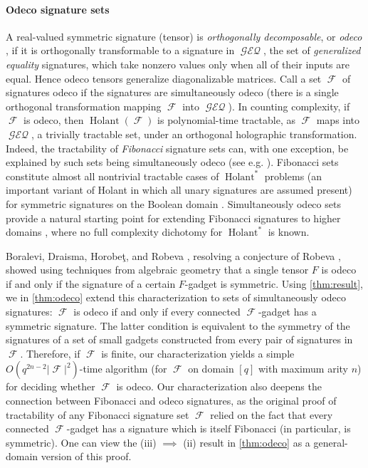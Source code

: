 \documentclass{article}
\DeclareMathOperator{\fc}{\mathcal{F}}
\DeclareMathOperator{\holant}{Holant}
\DeclareMathOperator{\geneq}{\mathcal{GEQ}}
\begin{document}
\paragraph{Odeco signature sets}
A real-valued symmetric signature (tensor) is \emph{orthogonally decomposable}, 
or \emph{odeco} \cite{robeva}, if it is orthogonally transformable to a signature in $\geneq$, the set
of \emph{generalized equality} signatures, which take nonzero values only when all of their inputs
are equal. Hence odeco tensors generalize diagonalizable matrices.
Call a set $\fc$ of signatures odeco if the signatures are simultaneously odeco (there
is a single orthogonal transformation mapping $\fc$ into $\geneq$).
In counting complexity, if $\fc$ is odeco, then
$\holant(\fc)$ is polynomial-time tractable, as $\fc$ maps into $\geneq$, a trivially tractable set,
under an orthogonal holographic transformation.
Indeed, the tractability of \emph{Fibonacci} signature sets \cite{cai2008holographic}
can, with one exception, be explained by such 
sets being simultaneously odeco (see e.g. \cite[Section 2.2]{cai_chen_2017}). 
Fibonacci sets constitute almost all nontrivial tractable cases of $\holant^*$ problems
(an important variant of Holant in which all unary signatures are assumed 
present) for symmetric signatures on the Boolean domain \cite{cai_computational_2011}.
Simultaneously odeco
sets provide a natural starting point for extending Fibonacci signatures to higher
domains \cite{liu_2024,domain3}, where no full complexity dichotomy for $\holant^*$ is known.

Boralevi, Draisma, Horobeţ, and Robeva \cite{boralevi_orthogonal_2017}, resolving a conjecture of
Robeva \cite{robeva}, showed using techniques from algebraic geometry that a single tensor $F$ is 
odeco if and only if the signature of 
a certain $F$-gadget is symmetric. Using \autoref{thm:result}, we in \autoref{thm:odeco} extend this 
characterization to sets of simultaneously odeco signatures: $\fc$ is odeco if and only if every connected 
$\fc$-gadget has a symmetric signature. The latter condition is 
equivalent to the symmetry of the signatures of a set of small gadgets constructed from 
every pair of 
signatures in $\fc$. Therefore, if $\fc$ is finite, our characterization yields a simple
$O(q^{2n-2} |\fc|^2)$-time algorithm (for $\fc$ on domain $[q]$ with maximum arity $n$) for deciding
whether $\fc$ is odeco.
Our characterization also deepens the connection between Fibonacci and odeco 
signatures, as the original proof of tractability of any Fibonacci signature set $\fc$
\cite{cai2008holographic} relied on the fact that every connected $\fc$-gadget has a signature which is
itself Fibonacci (in particular, is symmetric). 
One can view the (iii) $\implies$ (ii) result in \autoref{thm:odeco} as a general-domain version
of this proof.
\end{document}
